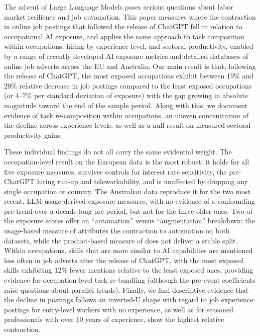 \documentclass[11pt]{article}
\begin{document}
The advent of Large Language Models poses serious questions about labor market resilience and job automation. This paper measures where the contraction in online job postings that followed the release of ChatGPT fell in relation to occupational AI exposure, and applies the same approach to task composition within occupations, hiring by experience level, and sectoral productivity, enabled by a range of recently developed AI exposure metrics and detailed databases of online job adverts across the EU and Australia. Our main result is that, following the release of ChatGPT, the most exposed occupations exhibit between 19\% and 29\% relative decrease in job postings compared to the least exposed occupations (or 4--7\% per standard deviation of exposure) with the gap growing in absolute magnitude toward the end of the sample period. Along with this, we document evidence of task re-composition within occupations, an uneven concentration of the decline across experience levels, as well as a null result on measured sectoral productivity gains.

These individual findings do not all carry the same evidential weight. The occupation-level result on the European data is the most robust: it holds for all five exposure measures, survives controls for interest rate sensitivity, the pre-ChatGPT hiring run-up and teleworkability, and is unaffected by dropping any single occupation or country. The Australian data reproduce it for the two most recent, LLM-usage-derived exposure measures, with no evidence of a confounding pre-trend over a decade-long pre-period, but not for the three older ones. Two of the exposure scores offer an ``automation'' versus ``augmentation'' breakdown; the usage-based measure of \citet{handa2025economic} attributes the contraction to automation on both datasets, while the product-based measure of \citet{demirev2024assessing} does not deliver a stable split. Within occupations, skills that are more similar to AI capabilities are mentioned less often in job adverts after the release of ChatGPT, with the most exposed skills exhibiting 12\% fewer mentions relative to the least exposed ones, providing evidence for occupation-level task re-bundling (although the pre-event coefficients raise questions about parallel trends). Finally, we find descriptive evidence that the decline in postings follows an inverted-U shape with regard to job experience: postings for entry-level workers with no experience, as well as for seasoned professionals with over 10 years of experience, show the highest relative contraction.
\end{document}
